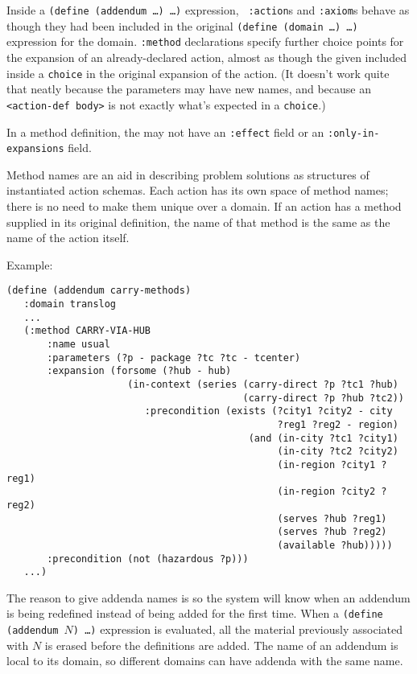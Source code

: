 Inside a {\tt (define (addendum \ldots) \ldots)} expression, {\tt
:action}s and {\tt :axiom}s behave as though they had been included in
the original {\tt (define (domain \ldots) \ldots)} expression for the
domain.  {\tt :method} declarations specify further choice points for
the expansion of an already-declared action, almost as though the 
given {\tt <action-def body>} included inside a {\tt choice} in the
original expansion of the action.  (It doesn't work quite that neatly
because the parameters may have new names, and because an {\tt
<action-def body>} is not exactly what's expected in a {\tt choice}.)
	
In a method definition, the {\tt <action-def body>} may not have 
an {\tt :effect} field or an {\tt :only-in-expansions} field.

Method names are an aid in describing problem solutions as structures
of instantiated action schemas.  Each action has its own space of
method names; there is no need to make them unique over a domain.  If
an action has a method supplied in its original definition, the name
of that method is the same as the name of the action itself.

Example:
\begin{verbatim}
(define (addendum carry-methods)
   :domain translog
   ...
   (:method CARRY-VIA-HUB
       :name usual
       :parameters (?p - package ?tc ?tc - tcenter)
       :expansion (forsome (?hub - hub)
                     (in-context (series (carry-direct ?p ?tc1 ?hub)
                                         (carry-direct ?p ?hub ?tc2))
                        :precondition (exists (?city1 ?city2 - city
                                               ?reg1 ?reg2 - region)
                                          (and (in-city ?tc1 ?city1)
                                               (in-city ?tc2 ?city2)
                                               (in-region ?city1 ?reg1)
                                               (in-region ?city2 ?reg2)
                                               (serves ?hub ?reg1)
                                               (serves ?hub ?reg2)
                                               (available ?hub)))))
       :precondition (not (hazardous ?p)))
   ...)
\end{verbatim}

The reason to give addenda names is so the system will know when an
addendum is being redefined instead of being added for the first time.
When a {\tt (define (addendum $N$) \ldots)} expression is evaluated,
all the material previously associated with $N$ is erased before the
definitions are added.  The name of an addendum is local to its
domain, so different domains can have addenda with the same name.

